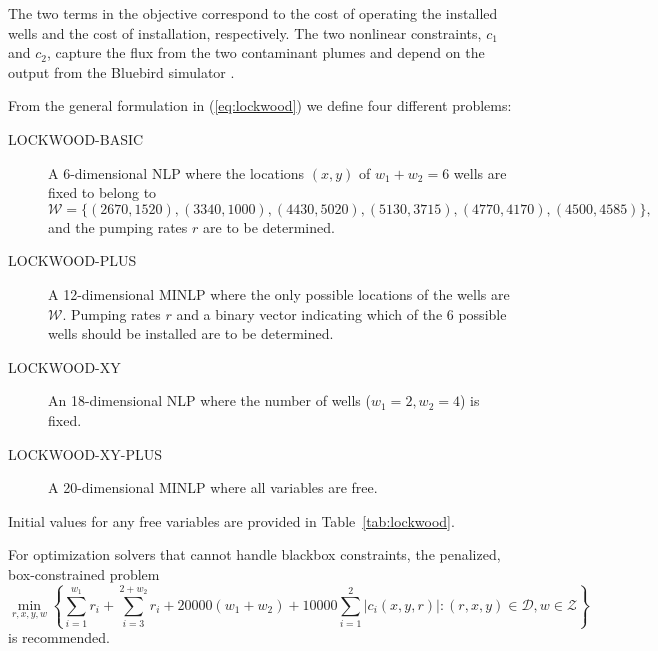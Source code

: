 \documentclass[11pt]{article}
\newcommand{\prob}[1]{{\textsf{\small #1}}}    %
\begin{document}
The two terms in the objective correspond to the cost of operating the installed wells and the cost of installation, respectively. The two nonlinear constraints, $c_1$ and $c_2$, capture the flux from the two contaminant plumes and depend on the output from the Bluebird simulator \cite{bluebird}. 

From the general formulation in (\ref{eq:lockwood}) we define four different problems:
\begin{description}
 \item[\prob{LOCKWOOD-BASIC}] A 6-dimensional NLP where the locations $(x,y)$ of $w_1+w_2=6$ wells are fixed to belong to
  \[
  \mathcal{W} = 
  \{(2670, 1520), (3340, 1000), (4430, 5020), (5130, 3715), (4770, 4170), (4500, 4585)\},
  \]
  and the pumping rates $r$ are to be determined.
 \item[\prob{LOCKWOOD-PLUS}] A 12-dimensional MINLP where the only possible locations
  of the wells are $\mathcal{W}$. 
  Pumping rates $r$ and a binary vector indicating which of the 6 possible wells should be installed are to be determined.
 \item[\prob{LOCKWOOD-XY}] An 18-dimensional NLP where the number of wells ($w_1=2,w_2=4$) is fixed.
 \item[\prob{LOCKWOOD-XY-PLUS}] A 20-dimensional MINLP where all variables are free.
\end{description}

Initial values for any free variables are provided in Table~\ref{tab:lockwood}.

For optimization solvers that cannot handle blackbox constraints, the penalized, box-constrained problem
\begin{equation}
\min_{r,x,y,w} \left\{\sum_{i=1}^{w_1} r_i + \sum_{i=3}^{2+w_2} r_i+ 20000(w_1+w_2) 
  + 10000\sum_{i=1}^2 |c_i(x,y,r)| :
 (r,x,y)\in\mathcal{D}, 
 w \in \mathcal{Z} \right\}
 \label{eq:lockwoodpenalty}
\end{equation}
is recommended.
\end{document}
